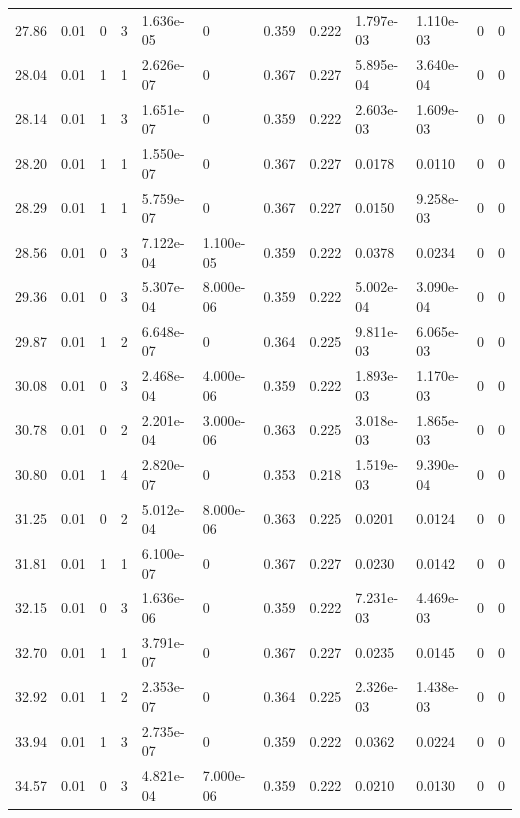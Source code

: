 \documentclass[preview]{standalone}
\begin{document}
{{{\begin{tabular}{L{1.2cm}C{1.2cm} C{0.3cm}C{0.5cm} C{1.4cm}C{1.4cm} C{1.4cm}C{1.4cm} C{1.6cm}C{1.6cm} C{1.6cm}C{1.6cm}}
  27.86  &  0.01  & 0     &  3 &  1.636e-05  & 0  &  0.359&   0.222& 1.797e-03 & 1.110e-03   &  0 & 0  \\ 
  28.04  &  0.01  & 1     &  1 &  2.626e-07  & 0  &  0.367&   0.227& 5.895e-04 & 3.640e-04   &  0 & 0  \\ 
  28.14  &  0.01  & 1     &  3 &  1.651e-07  & 0  &  0.359&   0.222& 2.603e-03 & 1.609e-03   &  0 & 0  \\ 
  28.20  &  0.01  & 1     &  1 &  1.550e-07  & 0  &  0.367&   0.227& 0.0178 & 0.0110   &  0 & 0  \\ 
  28.29  &  0.01  & 1     &  1 &  5.759e-07  & 0  &  0.367&   0.227& 0.0150 & 9.258e-03   &  0 & 0  \\ 
  28.56  &  0.01  & 0     &  3 &  7.122e-04  & 1.100e-05  &  0.359&   0.222& 0.0378 & 0.0234   &  0 & 0  \\ 
  29.36  &  0.01  & 0     &  3 &  5.307e-04  & 8.000e-06  &  0.359&   0.222& 5.002e-04 & 3.090e-04   &  0 & 0  \\ 
  29.87  &  0.01  & 1     &  2 &  6.648e-07  & 0  &  0.364&   0.225& 9.811e-03 & 6.065e-03   &  0 & 0  \\ 
  30.08  &  0.01  & 0     &  3 &  2.468e-04  & 4.000e-06  &  0.359&   0.222& 1.893e-03 & 1.170e-03   &  0 & 0  \\ 
  30.78  &  0.01  & 0     &  2 &  2.201e-04  & 3.000e-06  &  0.363&   0.225& 3.018e-03 & 1.865e-03   &  0 & 0  \\ 
  30.80  &  0.01  & 1     &  4 &  2.820e-07  & 0  &  0.353&   0.218& 1.519e-03 & 9.390e-04   &  0 & 0  \\ 
  31.25  &  0.01  & 0     &  2 &  5.012e-04  & 8.000e-06  &  0.363&   0.225& 0.0201 & 0.0124   &  0 & 0  \\ 
  31.81  &  0.01  & 1     &  1 &  6.100e-07  & 0  &  0.367&   0.227& 0.0230 & 0.0142   &  0 & 0  \\ 
  32.15  &  0.01  & 0     &  3 &  1.636e-06  & 0  &  0.359&   0.222& 7.231e-03 & 4.469e-03   &  0 & 0  \\ 
  32.70  &  0.01  & 1     &  1 &  3.791e-07  & 0  &  0.367&   0.227& 0.0235 & 0.0145   &  0 & 0  \\ 
  32.92  &  0.01  & 1     &  2 &  2.353e-07  & 0  &  0.364&   0.225& 2.326e-03 & 1.438e-03   &  0 & 0  \\ 
  33.94  &  0.01  & 1     &  3 &  2.735e-07  & 0  &  0.359&   0.222& 0.0362 & 0.0224   &  0 & 0  \\ 
  34.57  &  0.01  & 0     &  3 &  4.821e-04  & 7.000e-06  &  0.359&   0.222& 0.0210 & 0.0130   &  0 & 0  \\ 

\end{tabular}}}}
\end{document}

